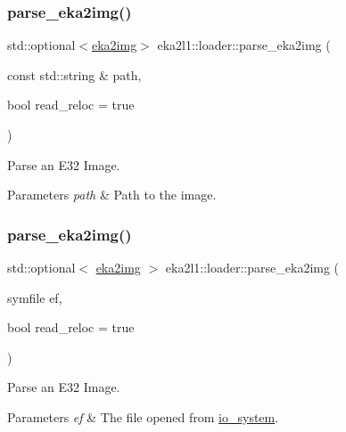 \subsubsection{\texorpdfstring{parse\+\_\+eka2img()}{parse\_eka2img()}\hspace{0.1cm}{\footnotesize\ttfamily [1/2]}}
{\footnotesize\ttfamily std\+::optional$<$\mbox{\hyperlink{structeka2l1_1_1loader_1_1eka2img}{eka2img}}$>$ eka2l1\+::loader\+::parse\+\_\+eka2img (\begin{DoxyParamCaption}\item[{const std\+::string \&}]{path,  }\item[{bool}]{read\+\_\+reloc = {\ttfamily true} }\end{DoxyParamCaption})}



Parse an E32 Image. 


\begin{DoxyParams}{Parameters}
{\em path} & Path to the image. \\
\hline
\end{DoxyParams}
\mbox{\label{namespaceeka2l1_1_1loader_ad995aa3132ef27f5c3ff776c632eaf28}} 
\subsubsection{\texorpdfstring{parse\+\_\+eka2img()}{parse\_eka2img()}\hspace{0.1cm}{\footnotesize\ttfamily [2/2]}}
{\footnotesize\ttfamily std\+::optional$<$ \mbox{\hyperlink{structeka2l1_1_1loader_1_1eka2img}{eka2img}} $>$ eka2l1\+::loader\+::parse\+\_\+eka2img (\begin{DoxyParamCaption}\item[{symfile}]{ef,  }\item[{bool}]{read\+\_\+reloc = {\ttfamily true} }\end{DoxyParamCaption})}



Parse an E32 Image. 


\begin{DoxyParams}{Parameters}
{\em ef} & The file opened from \mbox{\hyperlink{classeka2l1_1_1io__system}{io\+\_\+system}}. \\
\hline
\end{DoxyParams}
